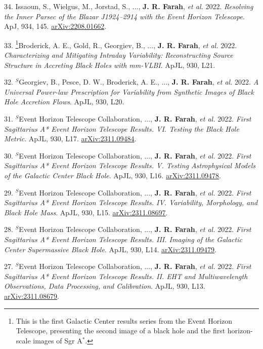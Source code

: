 \documentclass[margin,line]{res}
\newcommand{\apj}{ApJ}                    %
\newcommand{\apjl}{ApJL}                  %
\renewcommand{\thefootnote}{\fnsymbol{footnote}}
\begin{document}
\begin{resume}
34. Issaoun, S., Wielgus, M., Jorstad, S., ..., \textbf{J. R. Farah}, \textit{et al.} 2022. \textit{Resolving the Inner Parsec of the Blazar J1924--2914 with the Event Horizon Telescope}. \apj, 934, 145. \href{https://arxiv.org/abs/2208.01662}{arXiv:2208.01662}.

\begin{mdframed}[linecolor=red]
33. {\renewcommand{\thefootnote}{\ensuremath{S}}\renewcommand{\thempfootnote}{\ensuremath{S}}\footnote{This is the first Galactic Center results series from the Event Horizon Telescope, presenting the second image of a black hole and the first horizon-scale images of Sgr A$^\ast$.}}Broderick, A. E., Gold, R., Georgiev, B., ..., \textbf{J. R. Farah}, \textit{et al.} 2022. \textit{Characterizing and Mitigating Intraday Variability: Reconstructing Source Structure in Accreting Black Holes with mm-VLBI}. \apjl, 930, L21.

32. $^S$Georgiev, B., Pesce, D. W., Broderick, A. E., ..., \textbf{J. R. Farah}, \textit{et al.} 2022. \textit{A Universal Power-law Prescription for Variability from Synthetic Images of Black Hole Accretion Flows}. \apjl, 930, L20.

31. $^S$Event Horizon Telescope Collaboration, ..., \textbf{J. R. Farah}, \textit{et al.} 2022. \textit{First Sagittarius A* Event Horizon Telescope Results. VI. Testing the Black Hole Metric}. \apjl, 930, L17. \href{https://arxiv.org/abs/2311.09484}{arXiv:2311.09484}.

30. $^S$Event Horizon Telescope Collaboration, ..., \textbf{J. R. Farah}, \textit{et al.} 2022. \textit{First Sagittarius A* Event Horizon Telescope Results. V. Testing Astrophysical Models of the Galactic Center Black Hole}. \apjl, 930, L16. \href{https://arxiv.org/abs/2311.09478}{arXiv:2311.09478}.

29. $^S$Event Horizon Telescope Collaboration, ..., \textbf{J. R. Farah}, \textit{et al.} 2022. \textit{First Sagittarius A* Event Horizon Telescope Results. IV. Variability, Morphology, and Black Hole Mass}. \apjl, 930, L15. \href{https://arxiv.org/abs/2311.08697}{arXiv:2311.08697}.

28. $^S$Event Horizon Telescope Collaboration, ..., \textbf{J. R. Farah}, \textit{et al.} 2022. \textit{First Sagittarius A* Event Horizon Telescope Results. III. Imaging of the Galactic Center Supermassive Black Hole}. \apjl, 930, L14. \href{https://arxiv.org/abs/2311.09479}{arXiv:2311.09479}.

27. $^S$Event Horizon Telescope Collaboration, ..., \textbf{J. R. Farah}, \textit{et al.} 2022. \textit{First Sagittarius A* Event Horizon Telescope Results. II. EHT and Multiwavelength Observations, Data Processing, and Calibration}. \apjl, 930, L13. \href{https://arxiv.org/abs/2311.08679}{arXiv:2311.08679}.


\end{mdframed}
\end{resume}
\end{document}
